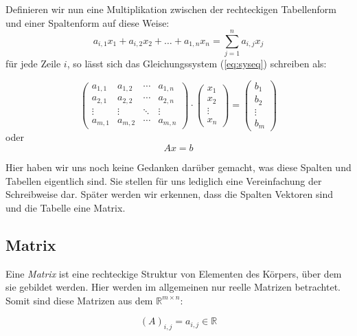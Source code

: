 Definieren wir nun eine Multiplikation zwischen der rechteckigen Tabellenform und einer Spaltenform auf diese Weise:
\begin{equation*}
a_{i,1}x_1 + a_{i,2}x_2 + \dots + a_{1,n}x_n = \sum_{j=1}^{n} a_{i,j}x_j
\end{equation*}
für jede Zeile $i$, so lässt sich das Gleichungssystem (\ref{eq:syseq}) schreiben als:

\begin{equation*}
\begin{pmatrix}
a_{1,1} & a_{1,2} & \cdots & a_{1,n} \\
a_{2,1} & a_{2,2} & \cdots & a_{2,n} \\
\vdots & \vdots & \ddots & \vdots \\
a_{m,1} & a_{m,2} & \cdots & a_{m,n}
\end{pmatrix} \cdot \begin{pmatrix}
x_1 \\
x_2 \\
\vdots \\
x_n
\end{pmatrix} = \begin{pmatrix}
b_1 \\
b_2 \\
\vdots \\
b_m
\end{pmatrix}
\end{equation*}
oder
\begin{equation*}
Ax=b
\end{equation*}

Hier haben wir uns noch keine Gedanken darüber gemacht, was diese Spalten und Tabellen eigentlich sind. Sie stellen für uns lediglich eine Vereinfachung der Schreibweise dar. Später werden wir erkennen, dass die Spalten Vektoren sind und die Tabelle eine Matrix.


\subsection{Matrix}

\begin{definition}
Eine \textsl{Matrix}  ist eine rechteckige Struktur von Elementen des Körpers, über dem sie gebildet werden. Hier werden im allgemeinen nur reelle Matrizen betrachtet. Somit sind diese Matrizen aus dem $\mathbb{R}^{m\times n}$:
\end{definition}

\begin{equation*}
(A)_{i,j} = a_{i,j} \in \mathbb{R}
\end{equation*}

